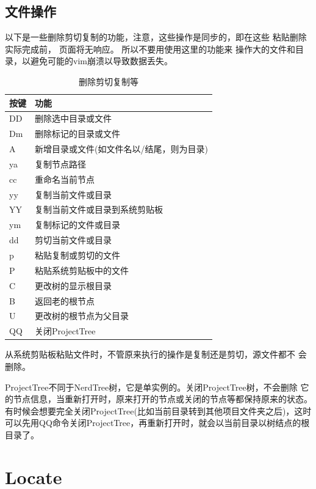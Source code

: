 \documentclass[oneside,openany]{book}
\begin{document}
  \subsection{文件操作}
  以下是一些删除剪切复制的功能，注意，这些操作是同步的，即在这些
粘贴删除实际完成前， 页面将无响应。 所以不要用使用这里的功能来
操作大的文件和目录，以避免可能的vim崩溃以导致数据丢失。
  \begin{table}[H]
  \caption{删除剪切复制等}
  \centering
      \begin{tabular}{p{40pt}p{220pt}}
        \toprule
        按键& 功能\\
        \midrule
          DD    &删除选中目录或文件\\
          Dm    &删除标记的目录或文件\\
          A     &新增目录或文件(如文件名以/结尾，则为目录)\\
          ya    &复制节点路径\\
          cc    &重命名当前节点\\
          yy    &复制当前文件或目录\\
          YY    &复制当前文件或目录到系统剪贴板\\
          ym    &复制标记的文件或目录\\
          dd    &剪切当前文件或目录\\
          p     &粘贴复制或剪切的文件\\
          P     &粘贴系统剪贴板中的文件\\
          C     &更改树的显示根目录\\
          B     &返回老的根节点\\
          U     &更改树的根节点为父目录\\
          QQ    &关闭ProjectTree\\
        \bottomrule
      \end{tabular}
  \end{table}

  从系统剪贴板粘贴文件时，不管原来执行的操作是复制还是剪切，源文件都不
会删除。

  ProjectTree不同于NerdTree树，它是单实例的。关闭ProjectTree树，不会删除
它的节点信息，当重新打开时，原来打开的节点或关闭的节点等都保持原来的状态。
有时候会想要完全关闭ProjectTree(比如当前目录转到其他项目文件夹之后)，这时
可以先用QQ命令关闭ProjectTree，再重新打开时，就会以当前目录以树结点的根目录了。


\section{Locate}
\end{document}
